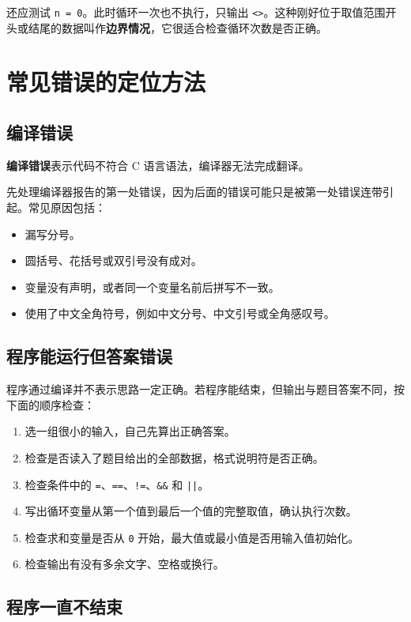 \documentclass[UTF8,zihao=-4,fontset=windows]{ctexart}
\newcommand{\term}[1]{\textbf{\color{navy}#1}}
\begin{document}
还应测试 \verb|n = 0|。此时循环一次也不执行，只输出 \verb|<>|。这种刚好位于取值范围开头或结尾的数据叫作\term{边界情况}，它很适合检查循环次数是否正确。

\section{常见错误的定位方法}

\subsection{编译错误}

\term{编译错误}表示代码不符合 C 语言语法，编译器无法完成翻译。

先处理编译器报告的第一处错误，因为后面的错误可能只是被第一处错误连带引起。常见原因包括：
\begin{itemize}
  \item 漏写分号。
  \item 圆括号、花括号或双引号没有成对。
  \item 变量没有声明，或者同一个变量名前后拼写不一致。
  \item 使用了中文全角符号，例如中文分号、中文引号或全角感叹号。
\end{itemize}

\subsection{程序能运行但答案错误}

程序通过编译并不表示思路一定正确。若程序能结束，但输出与题目答案不同，按下面的顺序检查：
\begin{enumerate}
  \item 选一组很小的输入，自己先算出正确答案。
  \item 检查是否读入了题目给出的全部数据，格式说明符是否正确。
  \item 检查条件中的 \verb|=|、\verb|==|、\verb|!=|、\verb|&&| 和 \verb+||+。
  \item 写出循环变量从第一个值到最后一个值的完整取值，确认执行次数。
  \item 检查求和变量是否从 \verb|0| 开始，最大值或最小值是否用输入值初始化。
  \item 检查输出有没有多余文字、空格或换行。
\end{enumerate}

\subsection{程序一直不结束}
\end{document}
